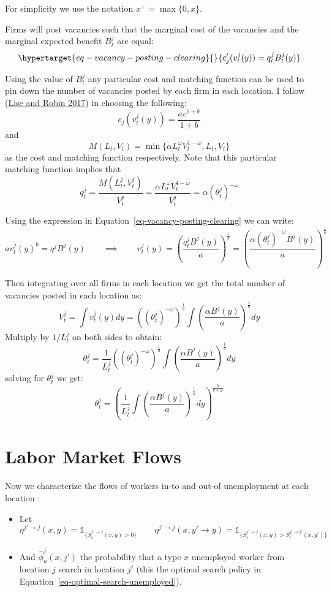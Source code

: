 \documentclass[
  letterpaper,
  DIV=11,
  numbers=noendperiod]{scrreprt}
\providecommand{\tightlist}{%
  \setlength{\itemsep}{0pt}\setlength{\parskip}{0pt}}\usepackage{longtable,booktabs,array}
\begin{document}
For simplicity we use the notation \(x^+ = \max\{0,x\}\).

Firms will post vacancies such that the marginal cost of the vacancies
and the marginal expected benefit \(B^j_t\) are equal:
\begin{equation}\protect\hypertarget{eq-vacancy-posting-clearing}{}{c_{j}'(v^{j}_t(y))=q^{j}_{t}B^{j}_{t}(y)}\label{eq-vacancy-posting-clearing}\end{equation}

Using the value of \(B^j_t\) any particular cost and matching function
can be used to pin down the number of vacancies posted by each firm in
each location. I follow
(\protect\hyperlink{ref-liseMacrodynamicsSortingWorkers2017}{Lise and
Robin 2017}) in choosing the following:
\[c_{j}(v^{j}_t(y)) = \frac{a v^{1+b}}{1+b}\] and
\[M(L_t, V_t) = \min\{\alpha L_t^{\omega} V_t^{1 - \omega}, L_t, V_t \}\]
as the cost and matching function respectively. Note that this
particular matching function implies that
\[q^j_t = \frac{M(L^j_t, V^j_t)}{V^j_t}=\frac{\alpha L_t^{\omega} V_t^{1 - \omega}}{V^j_t}= \alpha(\theta_t^j)^{-\omega}\]

Using the expression in Equation~\ref{eq-vacancy-posting-clearing} we
can write:
\[a v^{j}_t(y)^{b} = q^j B^j(y) \qquad \implies \qquad  v^{j}_t(y) = \left(\frac{q_t^j B^j(y)}{a}\right)^{\frac{1}{b}} = \left(\frac{\alpha(\theta_t^j)^{-\omega} B^j(y)}{a}\right)^{\frac{1}{b}} \]

Then integrating over all firms in each location we get the total number
of vacancies posted in each location as:
\[V_t^j = \int v^j_t(y)dy = \left((\theta_t^j)^{-\omega}\right)^{\frac{1}{b}}\int\left(\frac{\alpha B^j(y)}{a}\right)^{\frac{1}{b}}dy\]
Multiply by \(1/L^j_t\) on both sides to obtain:
\[\theta^j_t = \frac{1}{L^j_t}\left((\theta_t^j)^{-\omega}\right)^{\frac{1}{b}}\int\left(\frac{\alpha B^j(y)}{a}\right)^{\frac{1}{b}}dy\]
solving for \(\theta^j_t\) we get:
\[\theta^j_t = \left(\frac{1}{L^j_t}\int\left(\frac{\alpha B^j(y)}{a}\right)^{\frac{1}{b}}dy\right)^{\frac{b}{b+\omega}}\]

\hypertarget{labor-market-flows}{%
\section{Labor Market Flows}\label{labor-market-flows}}

Now we characterize the flows of workers in-to and out-of unemployment
at each location :

\begin{itemize}
\tightlist
\item
  Let
  \[\eta^{j' \to j}(x,y) = \mathbb{1}_{\{S_{t}^{j' \to j}(x,y)>0\}} \qquad \eta^{j' \to j}(x,y'\to y) = \mathbb{1}_{\{S^{j' \to j}_{t}(x,y) > S^{j' \to j'}_{t}(x,y')\}}\]
\item
  And \(\hat{\phi}^j_u(x,j')\) the probability that a type \(x\)
  unemployed worker from location \(j\) search in location \(j'\) (this
  the optimal search policy in
  Equation~\ref{eq-optimal-search-unemployed}).
\end{itemize}
\end{document}
